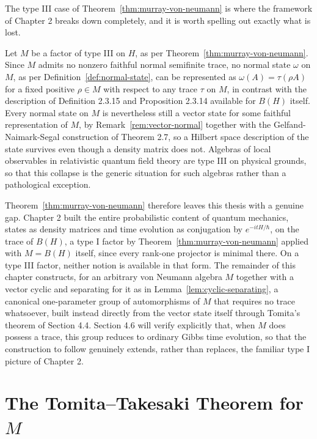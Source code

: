 The type III case of Theorem~\ref{thm:murray-von-neumann} is where the
framework of Chapter 2 breaks down completely, and it is worth spelling
out exactly what is lost.

\begin{remark}\label{rem:type-III-density-matrix}
	Let $M$ be a factor of type III on $H$, as per
	Theorem~\ref{thm:murray-von-neumann}. Since $M$ admits no nonzero
	faithful normal semifinite trace, no normal state $\omega$ on $M$, as
	per Definition~\ref{def:normal-state}, can be represented as
	$\omega(A) = \tau(\rho A)$ for a fixed positive $\rho \in M$ with
	respect to any trace $\tau$ on $M$, in contrast with the description of
	Definition 2.3.15 and Proposition 2.3.14 available for $B(H)$ itself.
	Every normal state on $M$ is nevertheless still a vector state for some
	faithful representation of $M$, by Remark~\ref{rem:vector-normal}
	together with the Gelfand-Naimark-Segal construction of Theorem 2.7,
	so a Hilbert space description of the state survives even though a
	density matrix does not. Algebras of local observables in relativistic
	quantum field theory are type III on physical grounds, so that this
	collapse is the generic situation for such algebras rather than a
	pathological exception. \cite[TODO: collocazione precisa]{TODO-QFTtypeIII}
\end{remark}

Theorem~\ref{thm:murray-von-neumann} therefore leaves this thesis with
a genuine gap. Chapter 2 built the entire probabilistic content of
quantum mechanics, states as density matrices and time evolution as
conjugation by $e^{-itH/\hbar}$, on the trace of $B(H)$, a type I
factor by Theorem~\ref{thm:murray-von-neumann} applied with $M = B(H)$
itself, since every rank-one projector is minimal there. On a type III
factor, neither notion is available in that form. The remainder of
this chapter constructs, for an arbitrary von Neumann algebra $M$
together with a vector cyclic and separating for it as in
Lemma~\ref{lem:cyclic-separating}, a canonical one-parameter group of
automorphisms of $M$ that requires no trace whatsoever, built instead
directly from the vector state itself through Tomita's theorem of
Section 4.4. Section 4.6 will verify explicitly that, when $M$ does
possess a trace, this group reduces to ordinary Gibbs time evolution,
so that the construction to follow genuinely extends, rather than
replaces, the familiar type I picture of Chapter 2.

\section{The Tomita--Takesaki Theorem for $M$}\label{sec:TT-for-M}

